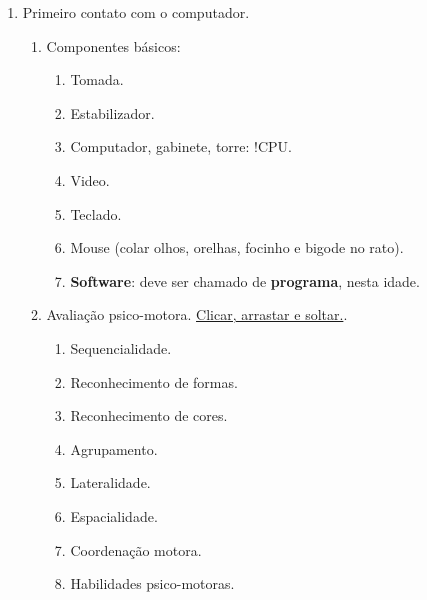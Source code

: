 \begin{enumerate}
	\item Primeiro contato com o computador.
	\begin{enumerate}
		\item Componentes básicos:
		\begin{enumerate}
			\item Tomada.
			\item Estabilizador.
			\item Computador, gabinete, torre: !CPU.
			\item Video.
			\item Teclado.
			\item Mouse (colar olhos, orelhas, focinho e bigode no rato).
			\item \textbf{Software}: deve ser chamado de \textbf{programa}, nesta idade.
		\end{enumerate}
	\item Avaliação psico-motora. \href{https://studio.code.org/s/pre-express-2023/lessons/1/levels/1?lang=pt-BR}{Clicar, arrastar e soltar.}.
	\begin{enumerate}
		\item Sequencialidade.
		\item Reconhecimento de formas.
		\item Reconhecimento de cores.
		\item Agrupamento.
		\item Lateralidade.
		\item Espacialidade.
		\item Coordenação motora.
		\item Habilidades psico-motoras.
	\end{enumerate}
	\end{enumerate}
\end{enumerate}


